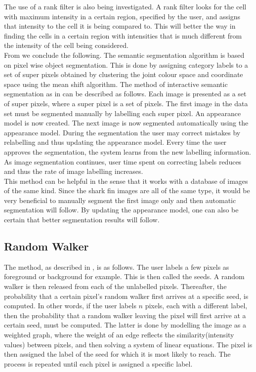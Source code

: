 \documentclass[a4paper,10pt]{article}
\begin{document}
The use of a rank filter is also being investigated.  A rank filter looks for the cell with maximum intensity in a certain region, specified by the user, 
and assigns that intensity to the cell it is being compared to.  This will better the way in finding the cells in a certain region with intensities that 
is much different from the intensity of the cell being considered. \\  

\noindent From \cite{RF} we conclude the following.  The semantic segmentation algorithm is based on pixel wise object segmentation.  This is done by 
assigning category labels to a set of super pixels obtained by clustering the joint colour space and coordinate space using the mean shift algorithm.
The method of interactive semantic segmentation as in \cite{RF} can be described as follows.  Each image is presented as a set of super pixels, where 
a super pixel is a set of pixels.  The first image in the data set must be segmented manually by labelling each super pixel.  An appearance model is 
now created.  The next image is now segmented automatically using the appearance model.  During the segmentation the user may correct mistakes by 
relabelling and thus updating the appearance model.  Every time the user approves the segmentation, the system learns from the new labelling information.
As image segmentation continues, user time spent on correcting labels reduces and thus the rate of image labelling increases.  \\

This method can be helpful in the sense that it works with a database of images of the same kind.  Since the shark fin images are all of the same type, 
it would be very beneficial to manually segment the first image only and then automatic segmentation will follow.  By updating the appearance model, 
one can also be certain that better segmentation results will follow.  \\  


\subsection{Random Walker}
The method, as
described in \cite{rw}, is as follows.  The user labels a few
pixels as foreground or background for example.  This is then called the seeds. 
A random walker is then released from each of the unlabelled pixels. 
Thereafter, the probability that a certain pixel's random walker first arrives
at a specific seed, is computed.  In other words, if the user labels $n$
pixels, each with a different label, then the probability that a random walker
leaving the pixel will first arrive at a certain seed, must be
computed.  The latter is done by modelling the image as a weighted graph, where
the weight of an edge reflects the similarity(intensity values) between pixels,
and then solving a system of linear equations.  The pixel is then assigned the label
of the seed for which it is most likely to reach.  The process is repeated until
each pixel is assigned a specific label. 
\end{document}

